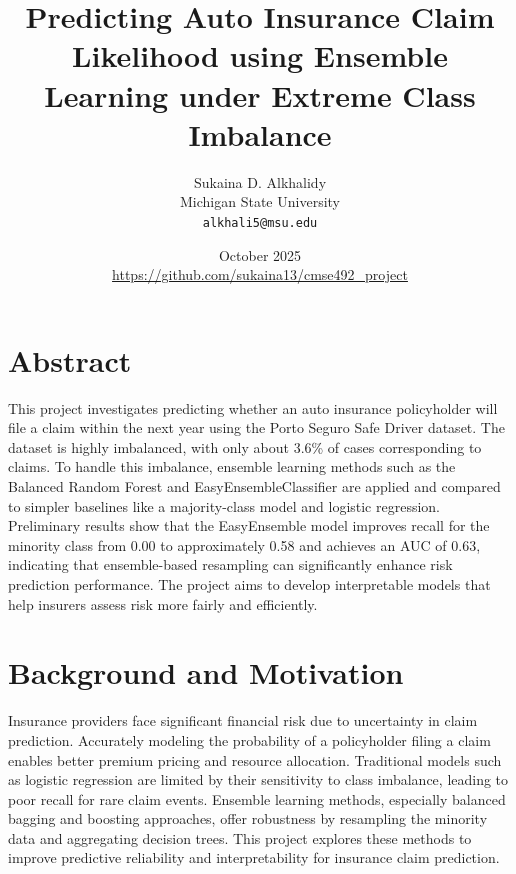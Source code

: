 \documentclass[11pt]{article}
\title{Predicting Auto Insurance Claim Likelihood using Ensemble Learning under Extreme Class Imbalance}
\author{Sukaina D. Alkhalidy \\ Michigan State University \\ \texttt{alkhali5@msu.edu}}
\date{October 2025 \\ \url{https://github.com/sukaina13/cmse492_project}}
\begin{document}
\maketitle

\section*{Abstract}
This project investigates predicting whether an auto insurance policyholder will file a claim within the next year using the Porto Seguro Safe Driver dataset. The dataset is highly imbalanced, with only about 3.6\% of cases corresponding to claims. To handle this imbalance, ensemble learning methods such as the Balanced Random Forest and EasyEnsembleClassifier are applied and compared to simpler baselines like a majority-class model and logistic regression. Preliminary results show that the EasyEnsemble model improves recall for the minority class from 0.00 to approximately 0.58 and achieves an AUC of 0.63, indicating that ensemble-based resampling can significantly enhance risk prediction performance. The project aims to develop interpretable models that help insurers assess risk more fairly and efficiently.

\section{Background and Motivation}
Insurance providers face significant financial risk due to uncertainty in claim prediction. Accurately modeling the probability of a policyholder filing a claim enables better premium pricing and resource allocation. Traditional models such as logistic regression are limited by their sensitivity to class imbalance, leading to poor recall for rare claim events. Ensemble learning methods, especially balanced bagging and boosting approaches, offer robustness by resampling the minority data and aggregating decision trees. This project explores these methods to improve predictive reliability and interpretability for insurance claim prediction.
\end{document}
